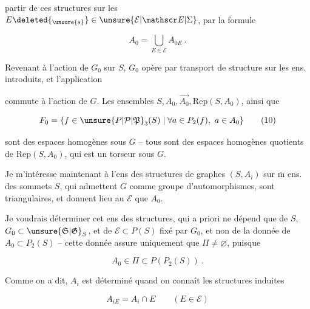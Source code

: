 
partir de ces structures sur les $E\deleted{_{\unsure{s}}}\in\unsure{\mathcal E|\mathscr E|\Sigma}$, par la formule

\[
 A_0=\bigcup_{E\in\mathcal E}A_{0E}\ . \tag*{(8)}
\]

Revenant à l'action de $G_0$ sur $S$, $G_0$ opère
par transport de structure sur les  ens. introduits, et l'application  


commute à l'action de $G$. Les ensembles
$S,A_0,\overrightarrow{A_0},\mathrm{Rep}(S,A_0)$, ainsi que

\[
 F_0=\{f\in\unsure{P|\mathcal P|\mathfrak P}_3(S)\mid\forall a\in P_2(f),\ a\in A_0\} \tag*{(10)}
\]

sont des espaces homogènes sous $G$ -- tous sont
des espaces homogènes quotients de $\mathrm{Rep}(S,A_0)$,
qui est un torseur sous $G$.

Je m'intéresse maintenant à l'ens des
structures de graphes $(S,A_i)$ sur  $\overline{\mathrm m}$ ens. des
sommets $S$, qui admettent $G$ comme groupe
d'automorphismes, sont triangulaires, et donnent
lieu au $\mathcal E$ que $A_0$. 

Je voudrais déterminer cet ens  des structures,
qui a priori ne dépend que de $S$, $G_0\subset\unsure{\mathfrak S|\mathfrak G}_S$,
et de $\mathcal E\subset P(S)$  fixé par $G_0$, et non
de  la donnée de $A_0\subset P_2(S)$ -- cette
donnée assure uniquement que $\Pi\ne\varnothing$, puisque

\[
 A_0\in\Pi\subset P(P_2(S))\ . \tag*{(11)}
\]

Comme on a dit,  $A_i$ est déterminé quand on
connaît les structures induites

\[
 A_{iE}=A_i\cap E\qquad(E\in\mathcal E) \tag*{(12)}
\]

